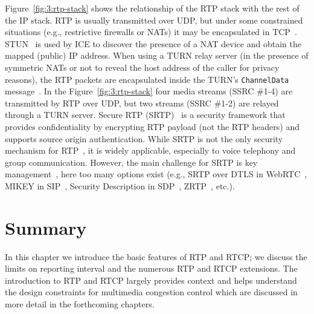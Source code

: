 Figure~\ref{fig:3:rtp-stack} shows the relationship of the RTP stack with the
rest of the IP stack. RTP is usually transmitted over UDP, but under some
constrained situations (e.g., restrictive firewalls or NATs) it may be
encapsulated in TCP~\cite{rfc3550}. STUN~\cite{rfc5389} is used by ICE to
discover the presence of a NAT device and obtain the mapped (public) IP
address. When using a TURN relay server (in the presence of symmetric NATs or
not to reveal the host address of the caller for privacy reasons), the RTP
packets are encapsulated inside the TURN's \texttt{ChannelData}
message~\cite{rfc5766}. In the Figure~\ref{fig:3:rtp-stack} four media streams
(SSRC \#1-4) are transmitted by RTP over UDP, but two streams (SSRC \#1-2) are
relayed through a TURN server. Secure RTP (SRTP)~\cite{rfc3611} is a security
framework that provides confidentiality by encrypting RTP payload (not the RTP
headers) and supports source origin authentication. While SRTP is not the only
security mechanism for RTP~\cite{draft.srtp-not-must}, it is widely
applicable, especially to voice telephony and group communication. However,
the main challenge for SRTP is key management~\cite{draft.sec-opts}, here too
many options exist (e.g., SRTP over DTLS in WebRTC~\cite{rfc5763}, MIKEY in
SIP~\cite{rfc3830}, Security Description in SDP~\cite{rfc4566},
ZRTP~\cite{RFC6189}, etc.).

\section{Summary}

In this chapter we introduce the basic features of RTP and RTCP; we discuss
the limits on reporting interval and the numerous RTP and RTCP extensions.
The introduction to RTP and RTCP largely provides context and helps understand
the design constraints  for multimedia congestion control which are discussed 
in more detail in the forthcoming chapters.
